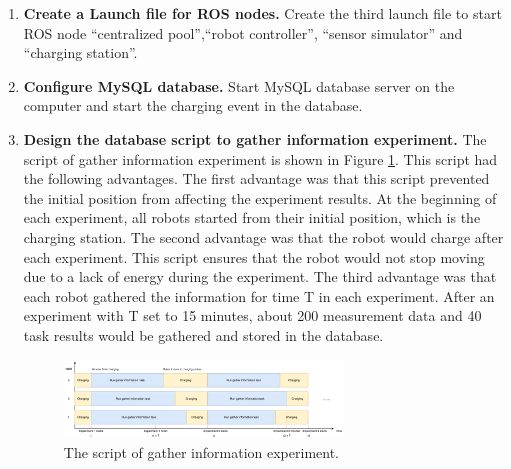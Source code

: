 \begin{enumerate}
 \item \textbf{Create a Launch file for ROS nodes.} Create the third launch file to start ROS node ``centralized pool'',``robot controller'', ``sensor simulator'' and ``charging station''. 
 \item \textbf{Configure MySQL database.} Start MySQL database server on the computer and start the charging event in the database.
 \item \textbf{Design the database script to gather information experiment.} The script of gather information experiment is shown in Figure \ref{fig:env_exp_timeline}. This script had the following advantages. The first advantage was that this script prevented the initial position from affecting the experiment results. At the beginning of each experiment, all robots started from their initial position, which is the charging station. The second advantage was that the robot would charge after each experiment. This script ensures that the robot would not stop moving due to a lack of energy during the experiment. The third advantage was that each robot gathered the information for time T in each experiment. After an experiment with T set to 15 minutes, about 200 measurement data and 40 task results would be gathered and stored in the database. 
 \begin{figure}[htbp]
 \centering
 \includegraphics[width = 0.7\textwidth]{content/images/ch5/env_exp_timeline.drawio.png}
 \caption{The script of gather information experiment.}
 \label{fig:env_exp_timeline}
 \end{figure}


\end{enumerate}
